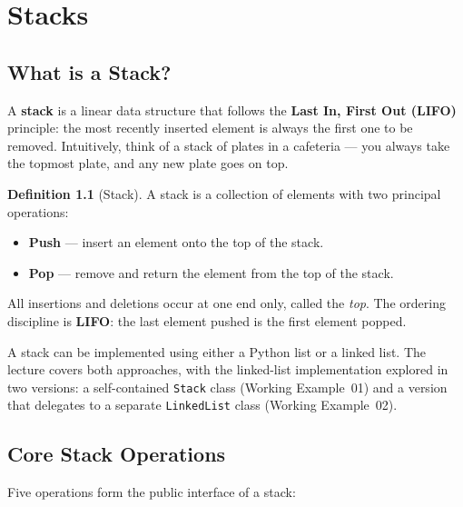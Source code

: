 \documentclass[11pt, a4paper, notitlepage]{report}
\theoremstyle{definition}
\newtheorem{definition}[theorem]{Definition}
\theoremstyle{remark}
\theoremstyle{definition}
\begin{document}
\chapter{Stacks}
\label{ch:stacks}

\section{What is a Stack?}
\label{sec:stack-intro}

A \textbf{stack} is a linear data structure that follows the \textbf{Last In, First Out (LIFO)}
principle: the most recently inserted element is always the first one to be removed.
Intuitively, think of a stack of plates in a cafeteria --- you always take the topmost
plate, and any new plate goes on top.

\begin{definition}[Stack]
\label{def:stack}
A stack is a collection of elements with two principal operations:
\begin{itemize}
  \item \textbf{Push} --- insert an element onto the top of the stack.
  \item \textbf{Pop} --- remove and return the element from the top of the stack.
\end{itemize}
All insertions and deletions occur at one end only, called the \emph{top}. The
ordering discipline is \textbf{LIFO}: the last element pushed is the first
element popped.
\end{definition}

A stack can be implemented using either a Python list or a linked list. The lecture
covers both approaches, with the linked-list implementation explored in two versions:
a self-contained \texttt{Stack} class (Working Example~01) and a version that
delegates to a separate \texttt{LinkedList} class (Working Example~02).

\section{Core Stack Operations}
\label{sec:stack-ops}

Five operations form the public interface of a stack:
\end{document}
